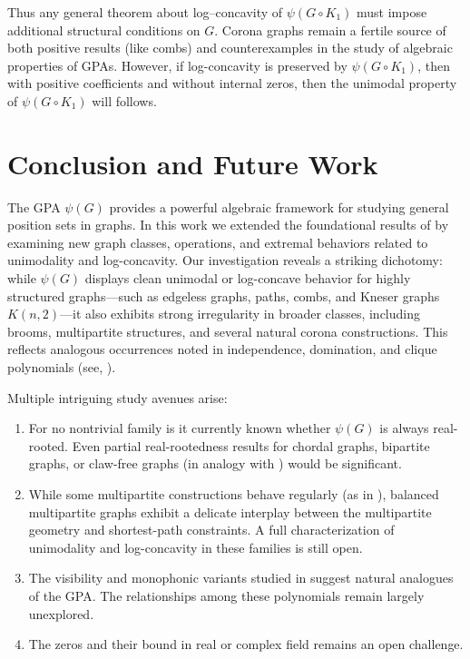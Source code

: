 \documentclass[12pt,twoside]{article}
\begin{document}
	

	Thus any general theorem about log–concavity of $\psi(G\circ K_1)$ must impose
	additional structural conditions on $G$. Corona graphs remain a fertile source
	of both positive results (like  combs) and counterexamples in the study of
	algebraic properties of GPAs. However, if log-concavity is preserved by $\psi(G\circ K_1)$, then  with positive coefficients and without internal zeros, then the unimodal property of $\psi(G\circ K_1)$ will follows.  
	
	
\section{Conclusion and Future Work}\label{section 8}

The GPA $\psi(G)$ provides a powerful algebraic
framework for studying general position sets in graphs. In this work we
extended the foundational results of \cite{0} by examining new graph classes,
operations, and extremal behaviors related to unimodality and log-concavity. Our investigation reveals a striking dichotomy: while $\psi(G)$ displays clean
unimodal or log-concave behavior for highly structured graphs—such as
edgeless graphs, paths, combs, and Kneser graphs $K(n,2)$—it also exhibits
strong irregularity in broader classes, including brooms, multipartite
structures, and several natural corona constructions. This reflects analogous occurrences noted in independence, domination, and clique polynomials (see, \cite{1,2,3,5,6,8,11,12,13,14,19}).

Multiple intriguing study avenues arise:
\begin{enumerate}
	
	\item 	For no nontrivial family is it currently known whether $\psi(G)$ is always
	real-rooted. Even partial real-rootedness results for chordal graphs, bipartite
	graphs, or claw-free graphs (in analogy with \cite{8,12}) would be significant.
	
	\item	While some multipartite constructions behave regularly (as in \cite{25}),
	balanced multipartite graphs exhibit a delicate interplay between the
	multipartite geometry and shortest-path constraints. A full characterization
	of unimodality and log-concavity in these families is still open.
	
	\item 	The visibility and monophonic variants studied in \cite{9,24} suggest natural
	analogues of the GPA. The relationships among these
	polynomials remain largely unexplored.
	\item The zeros and their bound in real or complex field remains an open challenge.
\end{enumerate}
\end{document}
